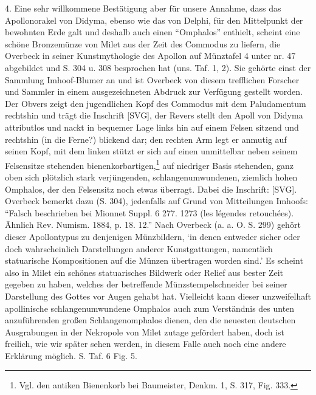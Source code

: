 \documentclass[a4paper, 11pt, oneside]{article}
\begin{document}
4. Eine sehr willkommene Bestätigung aber für unsere Annahme, dass das Apollonorakel von Didyma, ebenso wie das von Delphi, für den Mittelpunkt der bewohnten Erde galt und deshalb auch einen "`Omphalos"' enthielt, scheint eine schöne Bronzemünze von Milet aus der Zeit des Commodus zu liefern, die Overbeck in seiner Kunstmythologie des Apollon auf Münztafel 4 unter nr. 47 abgebildet und S. 304 u. 308 besprochen hat (uns. Taf. 1, 2). Sie gehörte einst der Sammlung Imhoof-Blumer an und ist Overbeck von diesem trefflichen Forscher und Sammler in einem ausgezeichneten Abdruck zur Verfügung gestellt worden. Der Obvers zeigt den jugendlichen Kopf des Commodus mit dem Paludamentum rechtshin und trägt die Inschrift [SVG], der Revers stellt den Apoll von Didyma attributlos und nackt in bequemer Lage links hin auf einem Felsen sitzend und rechtshin (in die Ferne?) blickend dar; den rechten Arm legt er anmutig auf seinen Kopf, mit dem linken stützt er sich auf einen unmittelbar neben seinem Felsensitze stehenden bienenkorbartigen,\footnote{Vgl. den antiken Bienenkorb bei Baumeister, Denkm. 1, S. 317, Fig. 333.} auf niedriger Basis stehenden, ganz oben sich plötzlich stark verjüngenden, schlangenumwundenen, ziemlich hohen Omphalos, der den Felsensitz noch etwas überragt. Dabei die Inschrift: [SVG]. Overbeck bemerkt dazu (S. 304), jedenfalls auf Grund von Mitteilungen Imhoofs: "`Falsch beschrieben bei Mionnet Suppl. 6 277. 1273 (les légendes retouchées). Ähnlich Rev. Numism. 1884, p. 18. 12."' Nach Overbeck (a. a. O. S. 299) gehört dieser Apollontypus zu denjenigen Münzbildern, `in denen entweder sicher oder doch wahrscheinlich Darstellungen anderer Kunstgattungen, namentlich statuarische Kompositionen auf die Münzen übertragen worden sind.' Es scheint also in Milet ein schönes statuarisches Bildwerk oder Relief aus bester Zeit gegeben zu haben, welches der betreffende Münzstempelschneider bei seiner Darstellung des Gottes vor Augen gehabt hat. Vielleicht kann dieser unzweifelhaft apollinische schlangenumwundene Omphalos auch zum Verständnis des unten anzuführenden großen Schlangenomphalos dienen, den die neuesten deutschen Ausgrabungen in der Nekropole von Milet zutage gefördert haben, doch ist freilich, wie wir später sehen werden, in diesem Falle auch noch eine andere Erklärung möglich. S. Taf. 6 Fig. 5.
\end{document}
